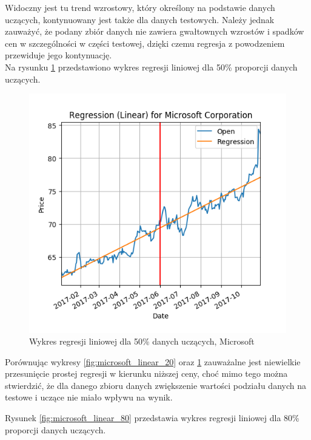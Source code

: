 Widoczny jest tu trend wzrostowy, który określony na podstawie danych uczących, kontynuowany jest także dla danych testowych.
Należy jednak zauważyć, że podany zbiór danych nie zawiera gwałtownych wzrostów i spadków cen w szczególności w części testowej, dzięki czemu regresja z powodzeniem przewiduje jego kontynuację.\\

Na rysunku \ref{fig:microsoft_linear_50} przedstawiono wykres regresji liniowej dla 50\% proporcji danych uczących.
\begin{figure}[ht]
\centering
\includegraphics[scale=0.4]{pictures/plots/microsoft_linear_50.png}
\caption{Wykres regresji liniowej dla 50\% danych uczących, Microsoft}
\label{fig:microsoft_linear_50}
\end{figure}

Porównując wykresy \ref{fig:microsoft_linear_20} oraz \ref{fig:microsoft_linear_50} zauważalne jest niewielkie przesunięcie prostej regresji w kierunku niższej ceny, 
choć mimo tego można stwierdzić, że dla danego zbioru danych zwiększenie wartości podziału danych na testowe i uczące nie miało wpływu na wynik.

Rysunek \ref{fig:microsoft_linear_80} przedstawia wykres regresji liniowej dla 80\% proporcji danych uczących.\\

